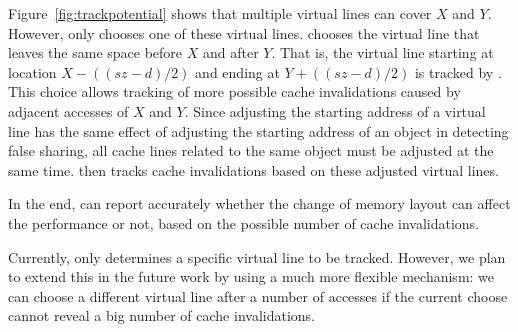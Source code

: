 Figure~\ref{fig:trackpotential} shows that multiple virtual lines can cover $X$ and $Y$. However, \Predator{} only chooses one of these virtual lines. \Predator{} chooses the virtual line that leaves the same space before $X$ and after $Y$. That is, the virtual line starting at location $X-((sz-d)/2)$ and ending at $Y+((sz-d)/2)$ is tracked by \Predator{}. This choice allows tracking of more possible cache invalidations caused by adjacent accesses of $X$ and $Y$. Since adjusting the starting address of a virtual line has the same effect of adjusting the starting address of an object in detecting false sharing, all cache lines related to the same object must be adjusted at the same time. \Predator{} then tracks cache invalidations based on these adjusted virtual lines.

In the end, \Predator{} can report accurately whether the change of memory layout can affect the performance or not, based on the possible number of cache invalidations. 

Currently, \predator{} only determines a specific virtual line to be tracked. However, we plan to extend this in the future work by using a much more flexible mechanism: we can choose a different virtual line after a number of accesses if the current choose cannot reveal a big number of cache invalidations.

